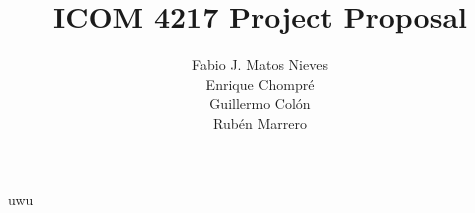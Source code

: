\documentclass[12pt]{report}
\title{ICOM 4217 Project Proposal}
\author{Fabio J. Matos Nieves\\
  Enrique Chompré\\
  Guillermo Colón\\
Rubén Marrero}
\begin{document}

uwu
\cite{bahendekaEADSGGuidelinesInsulin2019}


\end{document}
